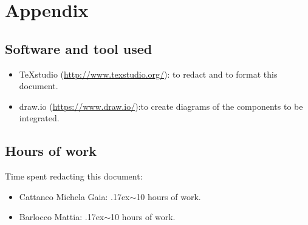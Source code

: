 \documentclass[18pt,oneside,a4paper, titlepage]{article}
\begin{document}
	\section{Appendix}
	\subsection{Software and tool used}
		\begin{itemize}
			\item TeXstudio (\url{http://www.texstudio.org/}): to redact and to format this document.
			\item draw.io (\url{https://www.draw.io/}):to create diagrams of the components to be integrated.
		\end{itemize}
	
	\subsection{Hours of work}
		Time spent redacting this document:
		\begin{itemize}
			\item Cattaneo Michela Gaia: {\raise.17ex\hbox{$\scriptstyle\sim$}}10 hours of work.
			\item Barlocco Mattia: {\raise.17ex\hbox{$\scriptstyle\sim$}}10 hours of work.
		\end{itemize}
\end{document}
